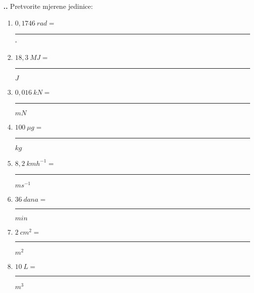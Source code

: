 \noindent 
\textbf{
\thecjelina.\thezadatak.}
Pretvorite mjerene jedinice:
\begin{enumerate}[label=\alph*)]
  \item $0,1746\ rad=$ \rule{3cm}{0.5pt} $ ^\circ $
  \item $18,3\ MJ =$ \rule{3cm}{0.5pt} $ J$
  \item $0,016\ kN =$ \rule{3cm}{0.5pt} $ mN$  
  \item $100\ \mu g= $ \rule{3cm}{0.5pt} $ kg$
  \item $8,2\ kmh^{-1} =$ \rule{3cm}{0.5pt} $ms^{-1}$
  \item $36\ dana =$ \rule{3cm}{0.5pt} $min $
  \item $2\ cm^2=$ \rule{3cm}{0.5pt} $m^2 $
  \item $10\ L =$ \rule{3cm}{0.5pt} $m^3$
\end{enumerate}


